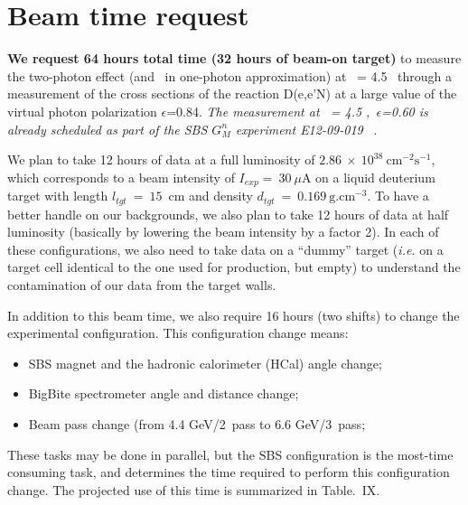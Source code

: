 \section{Beam time request}

{\bf We request 64 hours total time (32 hours of beam-on target)} to measure the two-photon effect (and \gen~in one-photon approximation) 
at \qsq~= 4.5 \gevcsq~through a measurement of the cross sections of the reaction D(e,e'N) at a large value of the virtual photon polarization $\epsilon$=0.84.
{\em The measurement at \qsq~= 4.5 \gevcsq,~$\epsilon$=0.60 is already scheduled as part of the SBS $G_M^n$ experiment E12-09-019}~ \cite{E12-09-019}.

We plan to take 12 hours of data at a full luminosity of $2.86~\times~10^{38}~\mathrm{cm}^{-2}\mathrm{s}^{-1}$, which corresponds to a beam intensity of $I_{exp} =~30~\mu$A on a liquid deuterium target with length $l_{tgt}~=~15$~cm and density $d_{tgt}~=~0.169~\mathrm{g.cm}^{-3}$. 
To have a better handle on our backgrounds, we also plan to take 12 hours of data at half luminosity (basically by lowering the beam intensity by a factor 2).
In each of these configurations, we also need to take data on a ``dummy'' target ({\it i.e.} on a target cell identical to the one used for production, but empty) to understand the contamination of our data from the target walls.

In addition to this beam time, we also require 16 hours (two shifts) to change the experimental configuration.
This configuration change means:
%
\begin{itemize}
\item{SBS magnet and the hadronic calorimeter (HCal) angle change;}
\item{BigBite spectrometer angle and distance change;}
\item{Beam pass change (from 4.4 GeV/2~pass to 6.6 GeV/3~pass;}
\end{itemize}
%
These tasks may be done in parallel, but the SBS configuration is the most-time consuming task, and determines the time required to perform this configuration change. The projected use of this time is summarized in Table.~IX.%

